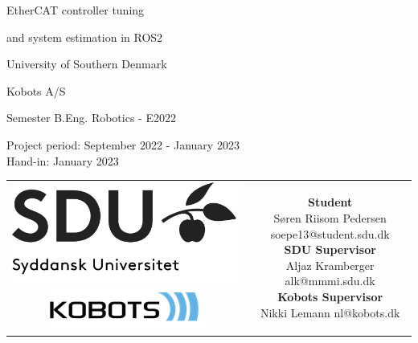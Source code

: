 \begin{titlepage}
	\begin{center}
		
		\null\vspace{2cm}
		
		{\huge
			EtherCAT controller tuning
			
			\vspace{6pt}
			
			and system estimation in ROS2
		}
	
		\vspace{1cm}
		
		{\Large
			University of Southern Denmark
			
			\vspace{6pt}
			
			Kobots A/S
		}
		
		\vspace{1cm}
		
		{\small
			 Semester B.Eng. Robotics - E2022
			
			\vspace{12pt}
			
			Project period: September  2022 - January  2023\\
			Hand-in: January  2023
		}
	
		\vfill
		
		\begin{tabular}{cc}
			\parbox{0.25\textwidth}{
				\includegraphics[width=0.25 \textwidth]{../resources/sdu-logo.png} \\
				\vspace{6pt}
				\includegraphics[width=0.25 \textwidth]{../resources/kobots-logo.png}
			}
			&
			\parbox{0.55\textwidth}{
				{\small
					\textbf{Student} \\
					Søren Riisom Pedersen \hfill soepe13@student.sdu.dk \\
					\textbf{SDU Supervisor} \\
					Aljaz Kramberger \hfill alk@mmmi.sdu.dk \\
					\textbf{Kobots Supervisor} \\
					Nikki Lemann \hfill nl@kobots.dk
				}
			}
		\end{tabular}

	\end{center}
\end{titlepage}
